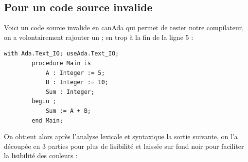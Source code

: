 \documentclass[french,a4paper]{article}
\begin{document}
    \subsection{Pour un code source invalide}\label{subsec:pour-un-code-source-invalide}

    Voici un code source invalide en canAda qui permet de tester notre compilateur, on a volontairement rajouter un ; en trop à la fin de la ligne 5 :

    \begin{lstlisting}[label={lst:lstlisting17}]
        with Ada.Text_IO; useAda.Text_IO;
        procedure Main is
            A : Integer := 5;
            B : Integer := 10;
            Sum : Integer;
        begin ;
            Sum := A + B;
        end Main;
    \end{lstlisting}

    On obtient alors après l'analyse lexicale et syntaxique la sortie suivante, on l'a découpée en 3 parties pour plus de lisibilité et laissée sur fond noir pour faciliter la lisibilité des couleurs :
\end{document}
